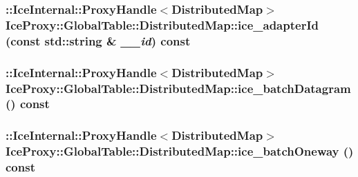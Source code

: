 \label{class_ice_proxy_1_1_global_table_1_1_distributed_map_aef433a6d435244568923a72eb70282f5}
\hypertarget{class_ice_proxy_1_1_global_table_1_1_distributed_map_a3aa5aa29f8b8613b475e3ca93ca5d18a}{
\subsubsection[{ice\_\-adapterId}]{\setlength{\rightskip}{0pt plus 5cm}::IceInternal::ProxyHandle$<${\bf DistributedMap}$>$ IceProxy::GlobalTable::DistributedMap::ice\_\-adapterId (const std::string \& {\em \_\-\_\-id}) const}}
\label{class_ice_proxy_1_1_global_table_1_1_distributed_map_a3aa5aa29f8b8613b475e3ca93ca5d18a}
\hypertarget{class_ice_proxy_1_1_global_table_1_1_distributed_map_a93ccde09585babaae043a7e656a45fa6}{
\subsubsection[{ice\_\-batchDatagram}]{\setlength{\rightskip}{0pt plus 5cm}::IceInternal::ProxyHandle$<${\bf DistributedMap}$>$ IceProxy::GlobalTable::DistributedMap::ice\_\-batchDatagram () const}}
\label{class_ice_proxy_1_1_global_table_1_1_distributed_map_a93ccde09585babaae043a7e656a45fa6}
\hypertarget{class_ice_proxy_1_1_global_table_1_1_distributed_map_a8477b60ac670660e64cc84b9cf3f4d33}{
\subsubsection[{ice\_\-batchOneway}]{\setlength{\rightskip}{0pt plus 5cm}::IceInternal::ProxyHandle$<${\bf DistributedMap}$>$ IceProxy::GlobalTable::DistributedMap::ice\_\-batchOneway () const}}
